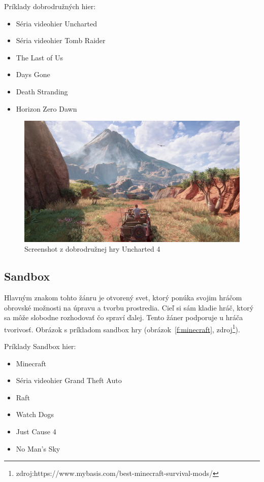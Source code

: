 \documentclass[10pt,oneside,slovak,a4paper]{article}
\begin{document}
Príklady dobrodružných hier:
\begin{itemize}
\item Séria videohier Uncharted
\item Séria videohier Tomb Raider
\item The Last of Us
\item Days Gone
\item Death Stranding
\item Horizon Zero Dawn
\end{itemize}

\begin{figure}[tbh]
\centering
\includegraphics[scale=0.2]{Screenshot.jpg}
\caption{Screenshot z dobrodružnej hry Uncharted 4}
\label{f:uncharted}
\end{figure}

\subsection{Sandbox} \label{zanre:sandbox}

Hlavným znakom tohto žánru je otvorený svet, ktorý ponúka svojim hráčom obrovské možnosti na úpravu a tvorbu prostredia. Cieľ si sám kladie hráč, ktorý sa môže slobodne rozhodovať čo spraví ďalej. Tento žáner podporuje u hráča tvorivosť. Obrázok s príkladom sandbox hry (obrázok~\ref{f:minecraft}, zdroj\footnote{zdroj:https://www.mybasis.com/best-minecraft-survival-mods/}).

Príklady Sandbox hier:
\begin{itemize}
\item Minecraft
\item Séria videohier Grand Theft Auto
\item Raft
\item Watch Dogs
\item Just Cause 4
\item No Man's Sky
\end{itemize}
\end{document}
